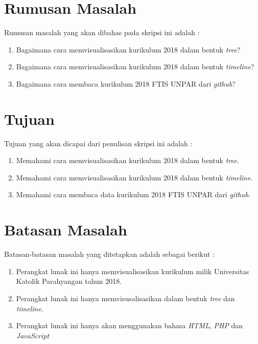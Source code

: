 \newpage
\section{Rumusan Masalah}
\label{sec:rumusan}
Rumusan masalah yang akan dibahas pada skripsi ini adalah : 
\begin{enumerate}
    \item Bagaimana cara memvisualisasikan kurikulum 2018 dalam bentuk \textit{tree}?
    \item Bagaimana cara memvisualisasikan kurikulum 2018 dalam bentuk \textit{timeline}?
    \item Bagaimana cara membaca kurikulum 2018 FTIS UNPAR dari \textit{github}?
\end{enumerate}



\section{Tujuan}
\label{sec:tujuan}
Tujuan yang akan dicapai dari penulisan skripsi ini adalah : 
\begin{enumerate}
    \item Memahami cara memvisualisasikan kurikulum 2018 dalam bentuk \textit{tree}.
    \item Memahami cara memvisualisasikan kurikulum 2018 dalam bentuk \textit{timeline}.
    \item Memahami cara membaca data kurikulum 2018 FTIS UNPAR dari \textit{github}.
\end{enumerate}



\section{Batasan Masalah}
\label{sec:batasan}
Batasan-batasan masalah yang ditetapkan adalah sebagai berikut :
\begin{enumerate}
    \item Perangkat lunak ini hanya memvisualisasikan kurikulum milik Universitas Katolik Parahyangan tahun 2018.
    \item Perangkat lunak ini hanya memvisusalisasikan dalam bentuk \textit{tree} dan \textit{timeline}.
    \item Perangkat lunak ini hanya akan menggunakan bahasa \textit{HTML}, \textit{PHP} dan \textit{JavaScript}
\end{enumerate}




